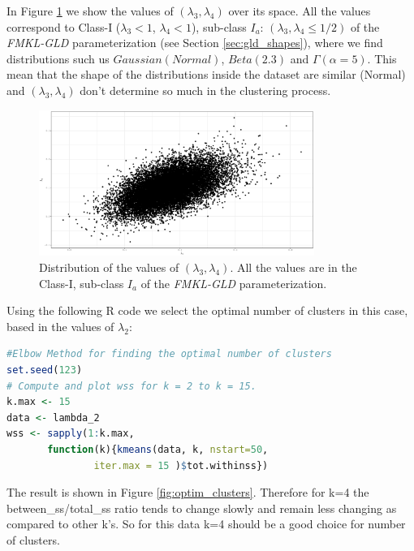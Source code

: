 In Figure \ref{fig:l3l4} we show the values of $(\lambda_{3}, \lambda_{4})$ over its space. All the values correspond to Class-I ($\lambda_{3} < 1$, $\lambda_{4}<1$), sub-class $I_{a}$: $(\lambda_{3}, \lambda_{4} \leq 1/2)$ of the \textit{FMKL-GLD} parameterization (see Section \ref{sec:gld_shapes}), where we find distributions such us $Gaussian (Normal)$, $Beta(2.3)$ and $\Gamma(\alpha = 5)$. This mean that the shape of the distributions inside the dataset are similar (Normal) and $(\lambda_{3}, \lambda_{4})$  don't determine so much in the clustering process.

\begin{figure}[H]
    \centering
    \includegraphics[width=0.8\textwidth]{img/use_cases/spus/l3l4.eps}
    \caption{Distribution of the values of $(\lambda_{3}, \lambda_{4})$. All the values are in the Class-I, sub-class $I_{a}$ of the \textit{FMKL-GLD} parameterization.}
    \label{fig:l3l4}
\end{figure}

Using the following R code we select the optimal number of clusters in this case, based in the values of $\lambda_2$:

\begin{lstlisting}[language=R]
#Elbow Method for finding the optimal number of clusters
set.seed(123)
# Compute and plot wss for k = 2 to k = 15.
k.max <- 15
data <- lambda_2
wss <- sapply(1:k.max, 
       function(k){kmeans(data, k, nstart=50,
               iter.max = 15 )$tot.withinss})
\end{lstlisting}

The result is shown in Figure \ref{fig:optim_clusters}. Therefore for k=4 the between\_ss/total\_ss ratio tends to change slowly and remain less changing as compared to other k's. So for this data k=4 should be a good choice for number of clusters.

